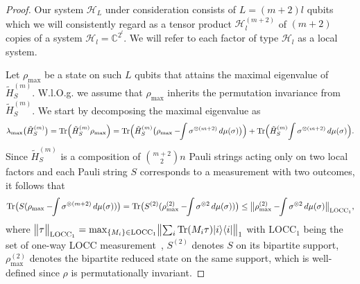 \begin{proof}
Our system $\mathcal{H}_L$ under consideration consists of $L=(m+2)l$ qubits which we will consistently regard as a tensor product $\mathcal{H}_l^{(m+2)}$ of $(m+2)$ copies of a system $\mathcal{H}_l = \mathbb{C}^{2^l}$. We will refer to each factor of type $\mathcal{H}_l$ as a local system.  

Let $\rho_{\max}$ be a state on such $L$ qubits that attains the maximal eigenvalue of  $\tilde{H}_S^{(m)}$. 
W.l.O.g. we assume that $\rho_{\max}$ inherits the permutation invariance from  $\tilde{H}_S^{(m)}$. 
We start by decomposing the maximal eigenvalue as
\begin{equation}
\lambda_{\max}\bigl(\tilde{H}_S^{(m)}\bigr)
= \operatorname{Tr}\Bigl(\tilde{H}_S^{(m)}\rho_{\max}\Bigr)
= \operatorname{Tr}\Bigl(\tilde{H}_S^{(m)}\bigl(\rho_{\max}-\!\!\int \sigma^{\otimes (m+2)}\,d\mu(\sigma)\bigr)\Bigr)
  + \operatorname{Tr}\Bigl(\tilde{H}_S^{(m)}\!\int \sigma^{\otimes (m+2)}\,d\mu(\sigma)\Bigr).
\end{equation}
Since $\tilde{H}_S^{(m)}$ is a composition of ${m+2 \choose 2}n$ Pauli strings acting only on two local factors and each Pauli string $S$ corresponds to a measurement with two outcomes, it follows that
\begin{equation}
\operatorname{Tr}\bigl(S(\rho_{\max}-\!\!\int \sigma^{\otimes (m+2)}\,d\mu(\sigma))\bigr)
= \operatorname{Tr}\bigl(S^{(2)}(\rho^{(2)}_{\max}-\!\!\int \sigma^{\otimes 2}\,d\mu(\sigma))\bigr)
\le \bigl\lVert\rho^{(2)}_{\max}-\!\!\int \sigma^{\otimes 2}\,d\mu(\sigma)\bigr\rVert_{\mathrm{LOCC}_1},
\end{equation}
where $\bigl\lVert \tau\bigr\rVert_{\mathrm{LOCC}_1} = \max_{\{M_i\}\in \mathrm{LOCC}_1} \bigl\lVert \sum_i \operatorname{Tr}(M_{i}\tau)|i\rangle\langle i| \bigl\lVert_1$ with $\mathrm{LOCC}_1$ being the set of one-way LOCC measurement~\cite{li2015quantum}, 
$S^{(2)}$ denotes $S$ on its bipartite support, $\rho^{(2)}_{\max}$ denotes the bipartite reduced state on the same support, which is well-defined since $\rho$ is permutationally invariant.


\end{proof}
